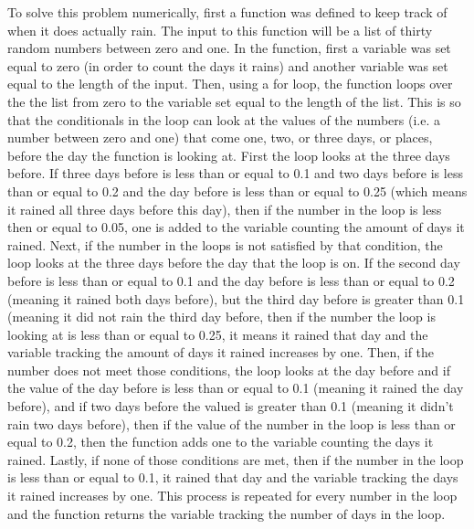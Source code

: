 \documentclass[twocolumn]{revtex4}
\begin{document}
	
	To solve this problem numerically, first a function was defined to keep track of when it
	does actually rain. The input to this function will be a list of thirty random numbers 
	between zero and one. In the function, first a variable was set equal to zero (in order to
	count the days it rains) and another variable was set equal to the length of the input.
	Then, using a for loop, the function loops over the the list from zero to the variable set 
	equal to the length of the list. This is so that the conditionals in the loop can look at the 
	values of the numbers (i.e. a number between zero and one) that come one, two, or 
	three days, or places, before the day the function is looking at. First the loop looks at
	the three days before. If 
	three days before is less than or equal to 0.1 and two days before is less than or equal 
	to 0.2 and the day before is less than or equal to 0.25 (which means it rained all three 
	days before this day), then if the number in the loop is less then or equal to 0.05, one is 
	added to the variable counting the amount of days it rained. Next, if the number in the 
	loops is not satisfied by that condition, the loop looks at 
	the three days before the day that the loop is on. If the second day before is 
	less than or equal to 0.1 and the day before is less than or equal to 0.2 (meaning it 
	rained both days before), but the third day before is greater than 0.1 (meaning it did not 
	rain the third day before, then if the number the loop is looking at is less than or equal 
	to 0.25, it means it rained that day and the variable tracking the amount of days it
	rained increases by one. Then, if the number does not meet those conditions, the loop
	looks at the day before and if the value of the day before is less than or equal to 0.1 
	(meaning it rained the day before), and if two days before the valued is greater than 0.1 
	(meaning it didn't rain two days before), then if the value of the number in the loop is 
	less than or equal to 0.2, then the function adds one to the variable counting the days it 
	rained. Lastly, if none of those conditions are met, then if the number in the loop is less
	than or equal to 0.1, it rained that day and the variable tracking the days it rained 
	increases by one. This process is repeated for every number in the loop and the 
	function returns the variable tracking the number of days in the loop.
	
\end{document}
